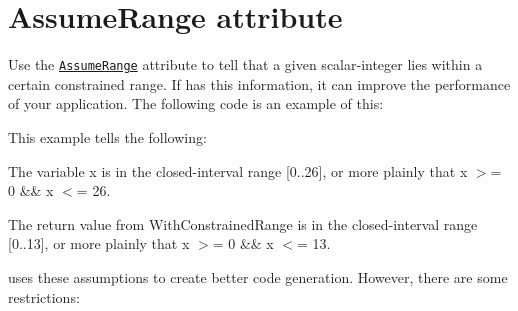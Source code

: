 \chapter{Assume\+Range attribute}
\hypertarget{md__hey_tea_9_2_library_2_package_cache_2com_8unity_8burst_0d1_88_87_2_documentation_0i_2optimization-assumerange}{}\label{md__hey_tea_9_2_library_2_package_cache_2com_8unity_8burst_0d1_88_87_2_documentation_0i_2optimization-assumerange}
\label{md__hey_tea_9_2_library_2_package_cache_2com_8unity_8burst_0d1_88_87_2_documentation_0i_2optimization-assumerange_autotoc_md417}%
%
 Use the \href{xref:Unity.Burst.CompilerServices.AssumeRangeAttribute}{\texttt{ {\ttfamily Assume\+Range}}} attribute to tell  that a given scalar-\/integer lies within a certain constrained range. If  has this information, it can improve the performance of your application. The following code is an example of this\+:


\begin{DoxyCode}{0}
\DoxyCodeLine{\textcolor{preprocessor}{\ \#}}
\DoxyCodeLine{\{}
\DoxyCodeLine{\}}

\end{DoxyCode}


This example tells  the following\+:


\begin{DoxyItemize}
\item The variable {\ttfamily x} is in the closed-\/interval range {\ttfamily \mbox{[}0..26\mbox{]}}, or more plainly that {\ttfamily x \texorpdfstring{$>$}{>}= 0 \&\& x \texorpdfstring{$<$}{<}= 26}.
\item The return value from {\ttfamily With\+Constrained\+Range} is in the closed-\/interval range {\ttfamily \mbox{[}0..13\mbox{]}}, or more plainly that {\ttfamily x \texorpdfstring{$>$}{>}= 0 \&\& x \texorpdfstring{$<$}{<}= 13}.
\end{DoxyItemize}

 uses these assumptions to create better code generation. However, there are some restrictions\+:


